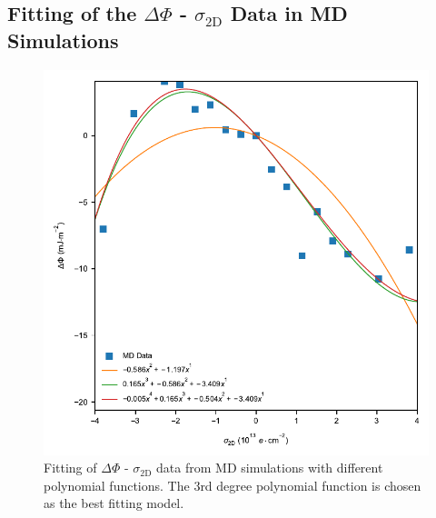 \documentclass[journal=ancac3,manuscript=suppinfo,email=true]{achemso}
\begin{document}
\begin{center}
\end{center}
\newpage{}
\subsection{Fitting of the \(\Delta \Phi\) - \(\sigma_{\mathrm{2D}}\) Data in MD Simulations}
\label{sec:orgb2e4751}
\begin{figure}[htbp]
\centering
\includegraphics[width=0.85\linewidth]{../img/e-Phi-fitting.pdf}
\caption{\label{fig-SI-fitting}
Fitting of \(\Delta \Phi\) - \(\sigma_{\mathrm{2D}}\) data from MD simulations with different polynomial functions. The 3rd degree polynomial function is chosen as the best fitting model.}
\end{figure}
\end{document}
